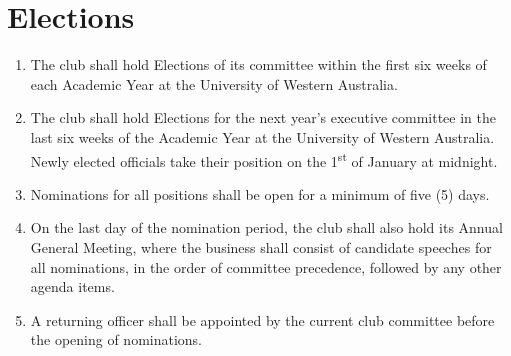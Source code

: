 \documentclass[10pt,a4paper]{report}
\begin{document}
	\section{Elections}
	\begin{enumerate}[label=\alph*]

		\item The club shall hold Elections of its committee within the first six weeks of each Academic Year at the University of Western Australia.

		\item The club shall hold Elections for the next year's executive committee in the last six weeks of the Academic Year at the University of Western Australia. Newly elected officials take their position on the 1\textsuperscript{st} of January at midnight.

		\item Nominations for all positions shall be open for a minimum of five (5) days.

		\item On the last day of the nomination period, the club shall also hold its Annual General Meeting, where the business shall consist of candidate speeches for all nominations, in the order of committee precedence, followed by any other agenda items.

		\item A returning officer shall be appointed by the current club committee before the opening of nominations.

	\end{enumerate}
\end{document}
